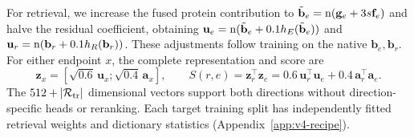For retrieval, we increase the fused protein contribution to
$\tilde{\mathbf{b}}_e=\operatorname{n}(\mathbf{g}_e+3s\mathbf{f}_e)$ and halve the residual
coefficient, obtaining
$\mathbf{u}_e=\operatorname{n}(\tilde{\mathbf{b}}_e+0.1h_E(\tilde{\mathbf{b}}_e))$ and
$\mathbf{u}_r=\operatorname{n}(\mathbf{b}_r+0.1h_R(\mathbf{b}_r))$.
These adjustments follow training on the native $\mathbf{b}_e,\mathbf{b}_r$.
For either endpoint $x$, the complete representation and score are
\begin{equation}
 \mathbf{z}_x=[\sqrt{0.6}\,\mathbf{u}_x;\sqrt{0.4}\,\mathbf{a}_x],\qquad
 S(r,e)=\mathbf{z}_r^\top\mathbf{z}_e
 =0.6\,\mathbf{u}_r^\top\mathbf{u}_e+0.4\,\mathbf{a}_r^\top\mathbf{a}_e.
 \label{eq:paper-score}
\end{equation}
The $512+|\mathcal{R}_{\mathrm{tr}}|$ dimensional vectors support both directions without
direction-specific heads or reranking. Each target training split has
independently fitted retrieval weights and dictionary statistics
(Appendix~\ref{app:v4-recipe}).
